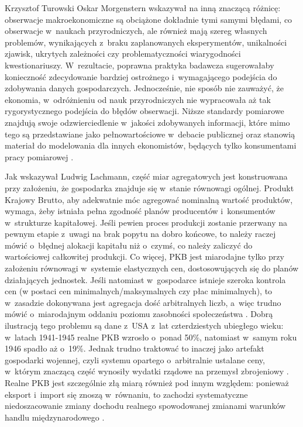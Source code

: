 \begin{artplenv}{Krzysztof Turowski}
Oskar Morgenstern wskazywał na inną znaczącą różnicę: obserwacje makroekonomiczne są obciążone dokładnie tymi samymi
błędami, co obserwacje w~naukach przyrodniczych, ale również mają szereg własnych problemów, wynikających z~braku
zaplanowanych eksperymentów, unikalności zjawisk, ukrytych zależności czy problematyczności wiarygodności
kwestionariuszy. W~rezultacie, poprawna praktyka badawcza sugerowałaby konieczność zdecydowanie bardziej
ostrożnego i~wymagającego podejścia do zdobywania danych gospodarczych. Jednocześnie, nie sposób nie zauważyć,
że ekonomia, w~odróżnieniu od nauk przyrodniczych nie wypracowała aż tak rygorystycznego podejścia do błędów obserwacji. Niższe
standardy pomiarowe znajdują swoje odzwierciedlenie w~jakości zdobywanych informacji, które mimo tego są przedstawiane
jako pełnowartościowe w~debacie publicznej oraz stanowią materiał do modelowania dla innych ekonomistów, będących tylko
konsumentami pracy pomiarowej
\parencite{morgenstern_accuracy_1963}.

Jak wskazywał Ludwig Lachmann, część miar agregatowych jest konstruowana przy założeniu, że gospodarka znajduje
się w~stanie równowagi ogólnej. Produkt Krajowy Brutto, aby adekwatnie móc agregować nominalną wartość produktów, wymaga,
żeby istniała pełna zgodność planów producentów i~konsumentów w~strukturze kapitałowej. Jeśli pewien proces produkcji
zostanie przerwany na pewnym etapie z~uwagi na brak popytu na dobro końcowe, to należy raczej mówić o~błędnej alokacji
kapitału niż o~czymś, co należy zaliczyć do wartościowej całkowitej produkcji. Co więcej, PKB jest miarodajne tylko
przy założeniu równowagi w~systemie elastycznych cen, dostosowujących się do planów działających jednostek. Jeśli
natomiast w~gospodarce istnieje szeroka kontrola cen (w postaci cen minimalnych/maksymalnych czy płac minimalnych), to
w~zasadzie dokonywana jest agregacja dość arbitralnych liczb, a~więc trudno mówić o~miarodajnym oddaniu poziomu
zasobności społeczeństwa
\parencite{lachmann_macro-economic_1973}.
Dobrą ilustracją tego problemu są dane z~USA z~lat
czterdziestych ubiegłego wieku: w~latach 1941-1945 realne PKB wzrosło o~ponad 50\%, natomiast w~samym roku 1946 spadło
aż o~19\%. Jednak trudno traktować to inaczej jako artefakt gospodarki wojennej, czyli systemu opartego o~arbitralnie
ustalane ceny, w~którym znaczącą część wynosiły wydatki rządowe na przemysł zbrojeniowy
\parencite{vedder_great_1991}.
Realne PKB jest szczególnie złą miarą również pod innym względem:
ponieważ eksport i~import się znoszą w~równaniu, to zachodzi systematyczne niedoszacowanie zmiany dochodu realnego
spowodowanej zmianami warunków handlu międzynarodowego
\parencite{kohli_real_2004}.


\end{artplenv}
